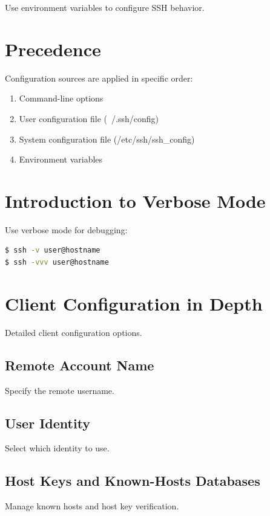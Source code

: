 \documentclass[12pt]{book}
\begin{document}
Use environment variables to configure SSH behavior.

\section{Precedence}

Configuration sources are applied in specific order:
\begin{enumerate}
    \item Command-line options
    \item User configuration file (~/.ssh/config)
    \item System configuration file (/etc/ssh/ssh_config)
    \item Environment variables
\end{enumerate}

\section{Introduction to Verbose Mode}

Use verbose mode for debugging:

\begin{lstlisting}[language=bash]
$ ssh -v user@hostname
$ ssh -vvv user@hostname
\end{lstlisting}

\section{Client Configuration in Depth}

Detailed client configuration options.

\subsection{Remote Account Name}

Specify the remote username.

\subsection{User Identity}

Select which identity to use.

\subsection{Host Keys and Known-Hosts Databases}

Manage known hosts and host key verification.
\end{document}
